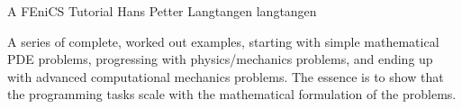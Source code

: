               {A FEniCS Tutorial}
              {Hans Petter Langtangen}
              {langtangen}

A series of complete, worked out examples, starting with simple
mathematical PDE problems, progressing with physics/mechanics
problems, and ending up with advanced computational mechanics
problems. The essence is to show that the programming tasks scale with
the mathematical formulation of the problems.
